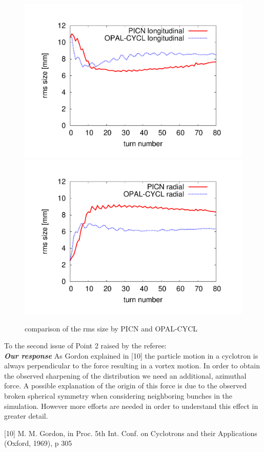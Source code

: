 \documentclass[10pt]{report}
\begin{document}
  \begin{figure}[H]
    {\includegraphics[width=14cm]{compare-long.pdf}}
    {\includegraphics[width=14cm]{compare-rad.pdf}}
    \caption{comparison of the rms size by PICN and OPAL-CYCL}
    \label{fig1}
  \end{figure}

To the second issue of Point 2 raised by the referee: \\
{\it {\bf Our response}}  As Gordon explained in [10] the particle motion in a cyclotron is always perpendicular to the force
resulting in a vortex motion. In order to obtain the observed sharpening of the distribution we
need an additional, azimuthal force. A possible explanation of the origin of this force is due to the observed broken spherical symmetry when considering neighboring bunches in the simulation. However more  efforts are needed in order to understand this effect in greater detail.

[10] M. M. Gordon, in Proc. 5th Int. Conf. on Cyclotrons and their Applications (Oxford, 1969), p 305


 
\end{document}
